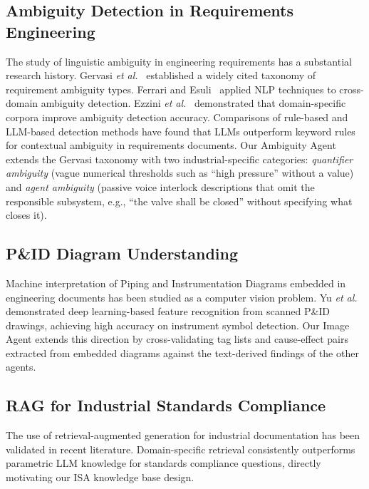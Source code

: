 \documentclass[journal]{IEEEtran}
\begin{document}
\subsection{Ambiguity Detection in Requirements Engineering}

The study of linguistic ambiguity in engineering requirements has a substantial
research history. Gervasi \textit{et al.}~\cite{gervasi2019} established a
widely cited taxonomy of requirement ambiguity types. Ferrari and
Esuli~\cite{ferrari2019} applied NLP techniques to cross-domain ambiguity
detection. Ezzini \textit{et al.}~\cite{ezzini2021} demonstrated that
domain-specific corpora improve ambiguity detection accuracy. Comparisons of
rule-based and LLM-based detection methods have found that LLMs outperform
keyword rules for contextual ambiguity in requirements documents. Our Ambiguity
Agent extends the Gervasi taxonomy with two industrial-specific categories:
\textit{quantifier ambiguity} (vague numerical thresholds such as ``high
pressure'' without a value) and \textit{agent ambiguity} (passive voice
interlock descriptions that omit the responsible subsystem, e.g., ``the valve
shall be closed'' without specifying what closes it).

\subsection{P\&ID Diagram Understanding}

Machine interpretation of Piping and Instrumentation Diagrams embedded in
engineering documents has been studied as a computer vision problem. Yu
\textit{et al.}~\cite{yu2019} demonstrated deep learning-based feature
recognition from scanned P\&ID drawings, achieving high accuracy on instrument
symbol detection. Our Image Agent extends this direction by cross-validating tag
lists and cause-effect pairs extracted from embedded diagrams against the
text-derived findings of the other agents.

\subsection{RAG for Industrial Standards Compliance}

The use of retrieval-augmented generation for industrial documentation has been
validated in recent literature. Domain-specific retrieval consistently
outperforms parametric LLM knowledge for standards compliance questions,
directly motivating our ISA knowledge base design.
\end{document}
